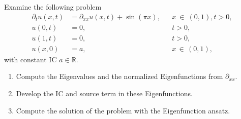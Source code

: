\documentclass[12pt]{article}
\begin{document}

\newpage
\begin{example}
	Examine the following problem
	\begin{align*}
		\partial_t u(x,t) & =\partial_{xx}u(x,t)+\sin(\pi x), &  & x\ \in\ (0,1), t>0, \\
		u(0,t)            & =0,                               &  & t>0,                \\
		u(1,t)            & =0,                               &  & t>0,                \\
		u(x,0)            & = a,                              &  & x\, \in\, (0,1) ,
	\end{align*}
	with constant IC $a\in\mathbb{R}$.
	\begin{enumerate}
		\item Compute the Eigenvalues and the normalized Eigenfunctions from $\partial_{xx}$.
		\item Develop the IC and source term in these Eigenfunctions.
		\item Compute the solution of the problem with the Eigenfunction ansatz.
	\end{enumerate}
\end{example}
\end{document}

